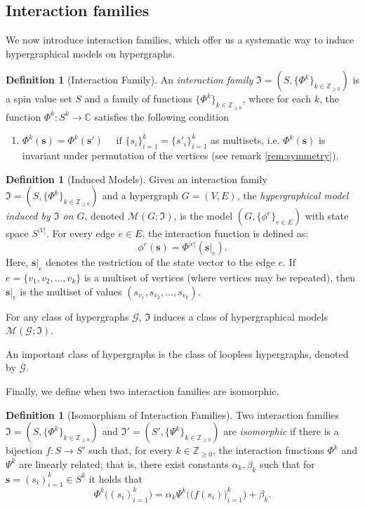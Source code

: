 \documentclass[11pt,reqno]{amsart}
\newcommand{\vecs}{\boldsymbol{s}}
\newcommand{\Mo}{\mathcal{M}}
\newcommand{\IFam}{\mathfrak{I}}
\newcommand{\sset}{spin value set }
\theoremstyle{plain}
\theoremstyle{definition}
\newtheorem{definition}[theorem]{Definition}
\numberwithin{equation}{section}
\begin{document}
\subsection{Interaction families}
We now introduce interaction families, which offer us a systematic way to induce hypergraphical models on hypergraphs.

\begin{definition}[Interaction Family]
\label{def:family}
An \emph{interaction family} $\IFam = (S, \{\Phi^k\}_{k \in \mathbb{Z}_{\geq 0}})$ is a \sset $S$ and a family of functions $\{\Phi^k\}_{k \in \mathbb{Z}_{\geq 0}}$, where for each $k$, the function $\Phi^k \colon S^k \to \mathbb{C}$ satisfies the following condition
\begin{enumerate}[(1)]
    \item $\Phi^k(\vecs) = \Phi^k(\vecs') \quad \text{ if } \{s_i \}_{i=1}^k = \{s'_i \}_{i=1}^k$ as multisets, i.e. $\Phi^k(\vecs)$ is invariant under permutation of the vertices (see remark \ref{rem:symmetry}).
\end{enumerate}
\end{definition}

\begin{definition}[Induced Models]
\label{def:modinst}
Given an interaction family $\IFam = (S, \{\Phi^k\}_{k \in \mathbb{Z}_{\geq 0}})$ and a hypergraph $G=(V,E)$, the \emph{hypergraphical model induced by $\IFam$ on $G$}, denoted $\Mo(G; \IFam)$, is the model $(G, \{\phi^e\}_{e \in E})$ with state space $S^{|V|}$. For every edge $e \in E$, the interaction function is defined as:
\[
    \phi^e(\vecs) = \Phi^{|e|}(\vecs|_e).
\]
Here, $\vecs|_e$ denotes the restriction of the state vector to the edge $e$. If $e = \{v_1, v_2, \dots, v_k\}$ is a multiset of vertices (where vertices may be repeated), then $\vecs|_e$ is the multiset of values $(s_{v_1}, s_{v_2}, \dots, s_{v_k})$.

For any class of hypergraphs $\mathcal{G}$, $\IFam$ induces a class of hypergraphical models $\Mo(\mathcal{G}; \IFam)$.
\end{definition}
An important class of hypergraphs is the class of loopless hypergraphs, denoted by $\overline{\mathcal{G}}$.


Finally, we define when two interaction families are isomorphic.

\begin{definition}[Isomorphism of Interaction Families]
\label{def:modclassiso}
Two interaction families $\IFam = (S, \{\Phi^k\}_{k \in \mathbb{Z}_{\geq 0}})$ and $\IFam' = (S', \{\Psi^k\}_{k \in \mathbb{Z}_{\geq 0}})$ are \emph{isomorphic} if there is a bijection $f \colon S \to S'$ such that, for every $k \in \mathbb{Z}_{\geq 0}$, the interaction functions $\Phi^k$ and $\Psi^k$ are linearly related; that is, there exist constants $\alpha_k, \beta_k$ such that for $\vecs = (s_i)_{i=1}^k \in S^k$ it holds that
\[\Phi^k\Big((s_i)_{i=1}^k\Big) = \alpha_k \Psi^k\Big(\big(f(s_i)\big)_{i=1}^k\Big) + \beta_k.\]
\end{definition}
\end{document}
